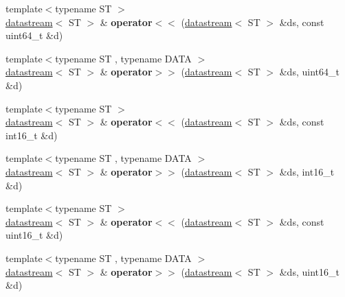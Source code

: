 \begin{DoxyCompactItemize}
\item 
\mbox{\label{namespacefc_a6f6bba5ee8934fc055a6827b214e8a59}} 
{\footnotesize template$<$typename ST $>$ }\\\mbox{\hyperlink{classfc_1_1datastream}{datastream}}$<$ ST $>$ \& {\bfseries operator$<$$<$} (\mbox{\hyperlink{classfc_1_1datastream}{datastream}}$<$ ST $>$ \&ds, const uint64\+\_\+t \&d)
\item 
\mbox{\label{namespacefc_aafe9a2bca408f1b83a488a47f748db1a}} 
{\footnotesize template$<$typename ST , typename D\+A\+TA $>$ }\\\mbox{\hyperlink{classfc_1_1datastream}{datastream}}$<$ ST $>$ \& {\bfseries operator$>$$>$} (\mbox{\hyperlink{classfc_1_1datastream}{datastream}}$<$ ST $>$ \&ds, uint64\+\_\+t \&d)
\item 
\mbox{\label{namespacefc_a0cf23c0c75615cfd5c32a8504b9ed6e2}} 
{\footnotesize template$<$typename ST $>$ }\\\mbox{\hyperlink{classfc_1_1datastream}{datastream}}$<$ ST $>$ \& {\bfseries operator$<$$<$} (\mbox{\hyperlink{classfc_1_1datastream}{datastream}}$<$ ST $>$ \&ds, const int16\+\_\+t \&d)
\item 
\mbox{\label{namespacefc_a35af3aea5b5e206bdae35f1534f577c0}} 
{\footnotesize template$<$typename ST , typename D\+A\+TA $>$ }\\\mbox{\hyperlink{classfc_1_1datastream}{datastream}}$<$ ST $>$ \& {\bfseries operator$>$$>$} (\mbox{\hyperlink{classfc_1_1datastream}{datastream}}$<$ ST $>$ \&ds, int16\+\_\+t \&d)
\item 
\mbox{\label{namespacefc_ae0ca37f743471323d221bedd8962b3eb}} 
{\footnotesize template$<$typename ST $>$ }\\\mbox{\hyperlink{classfc_1_1datastream}{datastream}}$<$ ST $>$ \& {\bfseries operator$<$$<$} (\mbox{\hyperlink{classfc_1_1datastream}{datastream}}$<$ ST $>$ \&ds, const uint16\+\_\+t \&d)
\item 
\mbox{\label{namespacefc_ac32c1c0696059aedbe8197042520e402}} 
{\footnotesize template$<$typename ST , typename D\+A\+TA $>$ }\\\mbox{\hyperlink{classfc_1_1datastream}{datastream}}$<$ ST $>$ \& {\bfseries operator$>$$>$} (\mbox{\hyperlink{classfc_1_1datastream}{datastream}}$<$ ST $>$ \&ds, uint16\+\_\+t \&d)

\end{DoxyCompactItemize}
